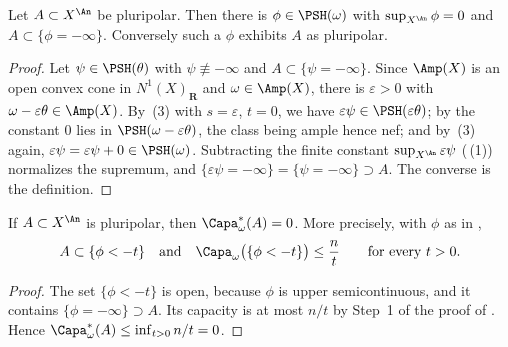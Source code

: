 \begin{lemma}
\label{lem:ch48-normalize-pole}
Let $A\subset X^{\An}$ be pluripolar.  Then there is
$\phi\in\PSH(\omega)$ with $\sup_{X^{\An}}\phi=0$ and
$A\subset\{\phi=-\infty\}$.  Conversely such a $\phi$ exhibits $A$ as
pluripolar.
\end{lemma}

\begin{proof}
Let $\psi\in\PSH(\theta)$ with $\psi\not\equiv-\infty$ and
$A\subset\{\psi=-\infty\}$.  Since $\Amp(X)$ is an open convex cone in
$N^1(X)_{\mathbf R}$ and $\omega\in\Amp(X)$, there is $\varepsilon>0$
with $\omega-\varepsilon\theta\in\Amp(X)$.  By
\,(3) with $s=\varepsilon$, $t=0$, we have
$\varepsilon\psi\in\PSH(\varepsilon\theta)$; by
 the constant $0$ lies in
$\PSH(\omega-\varepsilon\theta)$, the class being ample hence nef; and by
\,(3) again,
$\varepsilon\psi=\varepsilon\psi+0\in\PSH(\omega)$.  Subtracting the
finite constant $\sup_{X^{\An}}\varepsilon\psi$
(\,(1)) normalizes the supremum, and
$\{\varepsilon\psi=-\infty\}=\{\psi=-\infty\}\supset A$.  The converse is
the definition.
\end{proof}

\begin{proposition}
\label{prop:ch48-pluripolar-capacity}
If $A\subset X^{\An}$ is pluripolar, then $\Capa^*_\omega(A)=0$.  More
precisely, with $\phi$ as in ,
\[
 A\subset\{\phi<-t\}\quad\text{and}\quad
 \Capa_\omega\bigl(\{\phi<-t\}\bigr)\le\frac nt
 \qquad\text{for every }t>0 .
\]
\end{proposition}

\begin{proof}
The set $\{\phi<-t\}$ is open, because $\phi$ is upper semicontinuous,
and it contains $\{\phi=-\infty\}\supset A$.  Its capacity is at most
$n/t$ by Step~1 of the proof of .  Hence
$\Capa^*_\omega(A)\le\inf_{t>0}n/t=0$.
\end{proof}

